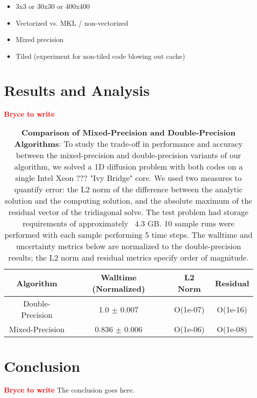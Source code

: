 \documentclass[conference]{IEEEtran}
\newcommand{\fix}[1]{{\bf \textcolor {red}{#1}}}
\begin{document}
\begin{itemize}
\item 3x3 or 30x30 or 400x400
\item Vectorized vs. MKL / non-vectorized
\item Mixed precision
\item Tiled (experiment for non-tiled code blowing out cache)
\end{itemize}

\section{Results and Analysis}
\fix{Bryce to write}

\begin{table}%
\center
\scriptsize
\caption{\textbf{Comparison of Mixed-Precision and Double-Precision Algorithms}:
To study the trade-off in performance and accuracy between the mixed-precision
and double-precision variants of our algorithm, we solved a 1D diffusion
problem with both codes on a single Intel Xeon ??? "Ivy Bridge" core. We used
two measures to quantify error: the L2 norm of the difference between the
analytic solution and the computing solution, and the absolute maximum of the
residual vector of the tridiagonal solve. The test problem had storage
requirements of approximately ~4.3 GB. 10 sample runs were performed with each
sample performing 5 time steps. The walltime and uncertainty metrics below are
normalized to the double-precision results; the L2 norm and residual metrics
specify order of magnitude.
}
\small
\setlength{\tabcolsep}{3pt}
\begin{tabular}{|c|c|c|c|} \hline
\textbf{Algorithm} & \textbf{Walltime (Normalized)} & \textbf{L2 Norm} & \textbf{Residual} \\ \hline
Double-Precision   & 1.0   $\pm$ 0.007              & O(1e-07)         & O(1e-16)          \\ \hline 
Mixed-Precision    & 0.836 $\pm$ 0.006              & O(1e-06)         & O(1e-08)          \\ \hline
\end{tabular}
\label{tab:mixed_vs_double}
\end{table}


\section{Conclusion}
\fix{Bryce to write}
The conclusion goes here.
\end{document}
